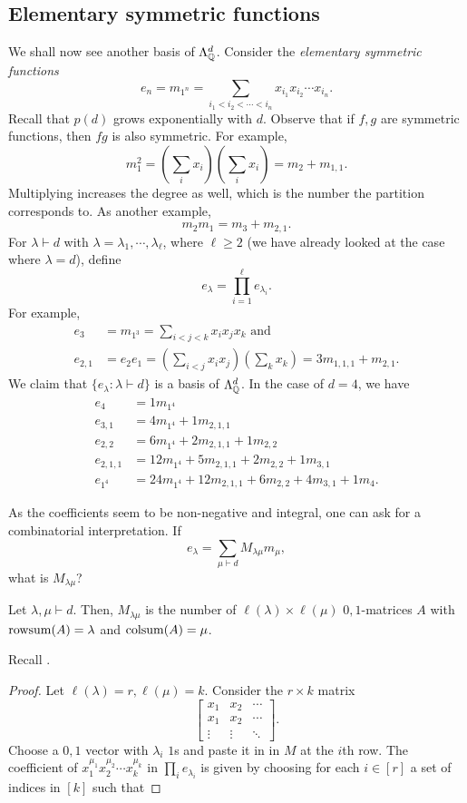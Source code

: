 \subsection{Elementary symmetric functions}

	We shall now see another basis of $\Lambda_{\mathbb{Q}}^d$. Consider the \emph{elementary symmetric functions}
	\[ e_{n} = m_{1^n} = \sum_{i_1 < i_2 < \cdots < i_n} x_{i_1} x_{i_2} \cdots x_{i_n}. \]
	Recall that $p(d)$ grows exponentially with $d$. Observe that if $f,g$ are symmetric functions, then $fg$ is also symmetric. For example,
	\[ m_1^2 = \left( \sum_i x_i \right)\left( \sum_i x_i \right) = m_2 + m_{1,1}. \]
	Multiplying increases the degree as well, which is the number the partition corresponds to. As another example,
	\[ m_2 m_1 = m_3 + m_{2,1}. \]
	For $\lambda \vdash d$ with $\lambda = \lambda_1,\cdots,\lambda_\ell$, where $\ell \ge 2$ (we have already looked at the case where $\lambda = d$), define
	\[ e_\lambda = \prod_{i=1}^\ell e_{\lambda_i}. \]
	For example,
	\begin{align*}
		e_3 &= m_{1^3} = \sum_{i < j < k} x_i x_j x_k \text{ and} \\
		e_{2,1} &= e_2e_1 = \left(\sum_{i < j} x_i x_j\right) \left(\sum_k x_k\right) = 3m_{1,1,1} + m_{2,1}.
	\end{align*}
	We claim that $\{e_\lambda : \lambda \vdash d\}$ is a basis of $\Lambda_{\mathbb{Q}}^d$.
	In the case of $d = 4$, we have
	\begin{align*}
		e_4 &= 1 m_{1^4} \\
		e_{3,1} &= 4m_{1^4} + 1m_{2,1,1} \\
		e_{2,2} &= 6m_{1^4} + 2m_{2,1,1} + 1m_{2,2} \\
		e_{2,1,1} &= 12m_{1^4} + 5m_{2,1,1} + 2m_{2,2} + 1m_{3,1} \\
		e_{1^4} &= 24m_{1^4} + 12m_{2,1,1} + 6m_{2,2} + 4m_{3,1} + 1m_{4}.
	\end{align*}

	As the coefficients seem to be non-negative and integral, one can ask for a combinatorial interpretation. If
	\[ e_\lambda = \sum_{\mu \vdash d} M_{\lambda\mu} m_\mu, \]
	what is $M_{\lambda\mu}$?

	\begin{ftheo}
		\label{theo: sol to rowsum colsum}
		Let $\lambda,\mu \vdash d$. Then, $M_{\lambda\mu}$ is the number of $\ell(\lambda) \times \ell(\mu)$ $0,1$-matrices $A$ with $\operatorname{rowsum}(A) = \lambda$ and $\operatorname{colsum}(A) = \mu$.
	\end{ftheo}
	Recall .
	\begin{proof}
		Let $\ell(\lambda) = r, \ell(\mu) = k$.
		Consider the $r \times k$ matrix
		\[ \begin{bmatrix} x_1 & x_2 & \cdots \\ x_1 & x_2 & \cdots \\ \vdots & \vdots & \ddots \end{bmatrix}. \]
		Choose a $0,1$ vector with $\lambda_i$ $1$s and paste it in in $M$ at the $i$th row. The coefficient of $x_1^{\mu_1} x_2^{\mu_2} \cdots x_k^{\mu_k}$ in $\prod_i e_{\lambda_i}$ is given by choosing for each $i \in [r]$ a set of indices in $[k]$ such that
	\end{proof}
	
